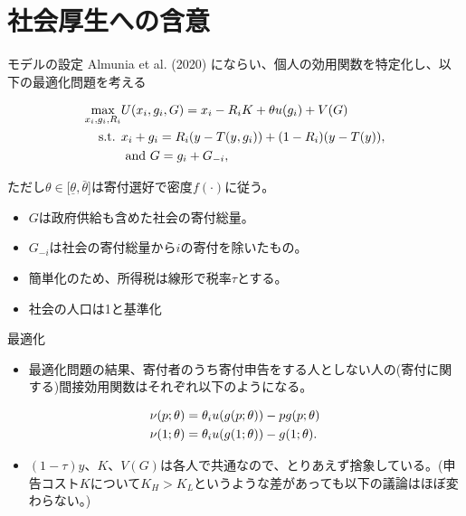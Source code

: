 \documentclass[
  ignorenonframetext,
  aspectratio=169,
]{beamer}
\providecommand{\tightlist}{%
  \setlength{\itemsep}{0pt}\setlength{\parskip}{0pt}}
\begin{document}
\hypertarget{ux793eux4f1aux539aux751fux3078ux306eux542bux610f}{%
\section{社会厚生への含意}\label{ux793eux4f1aux539aux751fux3078ux306eux542bux610f}}

\begin{frame}{モデルの設定}
\protect\hypertarget{ux30e2ux30c7ux30ebux306eux8a2dux5b9a}{}
Almunia et al. (2020) にならい、個人の効用関数を特定化し、以下の最適化問題を考える

\begin{align}
  \max_{x_i,g_i,R_i}&U(x_i,g_i,G)= x_i - R_iK +\theta u(g_i) + V(G)\notag\\
  \text{s.t. }&x_i + g_i = R_i(y-T(y, g_i)) + (1-R_i)(y-T(y)),\notag\\
  &\text{ and }G=g_i+G_{-i}\notag,
\end{align}

ただし\(\theta\in[\underline{\theta},\bar{\theta}\){]}は寄付選好で密度\(f(\cdot)\)に従う。

\begin{itemize}
\tightlist
\item
  \(G\)は政府供給も含めた社会の寄付総量。
\item
  \(G_{-i}\)は社会の寄付総量から\(i\)の寄付を除いたもの。
\item
  簡単化のため、所得税は線形で税率\(\tau\)とする。
\item
  社会の人口は1と基準化
\end{itemize}
\end{frame}

\begin{frame}{最適化}
\protect\hypertarget{ux6700ux9069ux5316}{}
\begin{itemize}
\tightlist
\item
  最適化問題の結果、寄付者のうち寄付申告をする人としない人の(寄付に関する)間接効用関数はそれぞれ以下のようになる。
\end{itemize}

\begin{align}
  \nu(p;\theta)&=\theta_i u(g(p;\theta))-pg(p;\theta)\notag\\
  \nu(1;\theta)&=\theta_i u(g(1;\theta))-g(1;\theta)\notag.
\end{align}

\begin{itemize}
\tightlist
\item
  \((1-\tau)y\)、\(K\)、\(V(G)\)は各人で共通なので、とりあえず捨象している。(申告コスト\(K\)について\(K_H>K_L\)というような差があっても以下の議論はほぼ変わらない。)
\end{itemize}
\end{frame}
\end{document}
